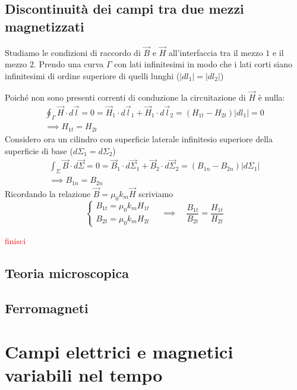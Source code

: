 \documentclass[x11names]{report}
\begin{document}
\subsection{Discontinuità dei campi tra due mezzi magnetizzati}
Studiamo le condizioni di raccordo di \(\vec{B}\) e \(\vec{H}\) all'interfaccia tra il mezzo \(1\) e il mezzo \(2\). Prendo una curva \(\Gamma\) con lati infinitesimi in modo che i lati corti siano infinitesimi di ordine superiore di quelli lunghi (\(|dl_1| = |dl_2|\))

Poiché non sono presenti correnti di conduzione la circuitazione di \(\vec{H}\) è nulla:
\begin{gather*}
	\oint_\Gamma \vec{H} \cdot d\vec{l} = 0 = \vec{H}_1 \cdot d\vec{l}_1 + \vec{H}_1 \cdot d\vec{l}_2 = (H_{1t} - H_{2t})|dl_1| = 0 \\
	\implies H_{1t} = H_{2t}
\end{gather*}
Considero ora un cilindro con superficie laterale infinitesio superiore della superficie di base (\(d\Sigma_1 = d\Sigma_2\))
\begin{gather*}
	\int_\Sigma \vec{B} \cdot d\vec{\Sigma} = 0 = \vec{B}_1 \cdot d\vec{\Sigma}_1 + \vec{B}_2 \cdot d\vec{\Sigma}_2 = (B_{1n} - B_{2n}) |d\Sigma_1| \\
	\implies B_{1n} = B_{2n}
\end{gather*}
Ricordando la relazione \(\vec{B} = \mu_0 k_m \vec{H}\) scriviamo
\[
\begin{cases}
	B_{1t} = \mu_0 k_m H_{1t} \\
	B_{2t} = \mu_0 k_m H_{2t}
\end{cases} \quad \implies \quad
\frac{B_{1t}}{B_{2t}} = \frac{H_{1t}}{H_{2t}}
\]

\textcolor{red}{finisci}

\subsection{Teoria microscopica}

\subsection{Ferromagneti}


\section{Campi elettrici e magnetici variabili nel tempo}
\end{document}
